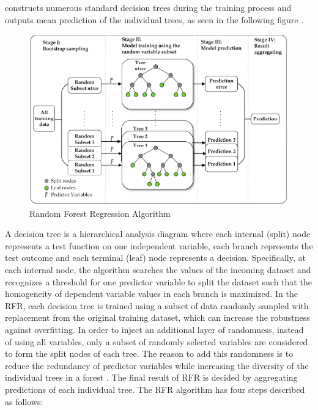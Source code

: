 constructs numerous standard decision trees during the training process and outputs mean prediction of
the individual trees, as seen in the following figure \cite{xu2019water}. 
\begin{figure}[htbp]
\centering
\includegraphics[width=0.9\linewidth]{project/rf2.PNG}

\caption{Random Forest Regression Algorithm}
\end{figure}
\newpage
A decision tree is a hierarchical analysis diagram where each internal (split) node represents a test function on one independent variable, each branch represents the test outcome and each terminal (leaf) node represents a decision. Specifically, at each internal node, the algorithm searches the values of the incoming dataset and recognizes a threshold for one predictor variable to split the dataset such that the homogeneity of dependent variable values in each branch is maximized. In the RFR, each decision tree is trained using a subset of data randomly sampled with replacement from the original training dataset, which can increase the robustness against overfitting. In order to inject an additional layer of randomness, instead of using all variables, only a subset of randomly selected variables are considered to form the split nodes of each tree. The reason to add this randomness is to reduce the redundancy of predictor variables while increasing the diversity of the individual trees in a forest \cite{breiman2001random}. The final result of RFR is decided by aggregating predictions of each individual tree. The RFR algorithm has four steps described as follows:
